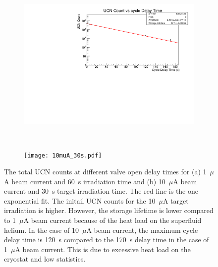 \begin{figure}[h!]
  \centering
  \begin{subfigure}{.8\textwidth}
    \centering
    \includegraphics[width=1.0\textwidth]{17002_StorageLifetime.pdf}
    \caption{}
    \label{fig:storage_example1}
  \end{subfigure}%
  \\
  \begin{subfigure}{.8\textwidth}
    \centering
    \texttt{[image: 10muA\_30s.pdf]}
    \caption{}
    \label{fig:storage_example10}
  \end{subfigure}
  \caption[UCN storage lifetime extraction for two beam currents]{The
    total UCN counts at different valve open delay times for (a)
    1~$\mu$A beam current and 60~s irradiation time and (b) 10~$\mu$A
    beam current and 30~s target irradiation time. The red line is the
    one exponential fit. The initail UCN counts for the 10~$\mu$A
    target irradiation is higher. However, the storage lifetime is
    lower compared to 1~$\mu$A beam current because of the heat load
    on the superfluid helium. In the case of 10~$\mu$A beam current,
    the maximum cycle delay time is 120~s compared to the 170~s delay
    time in the case of 1~$\mu$A beam current. This is due to
    excessive heat load on the cryostat and low statistics.}
  \label{fig:storage_example}
\end{figure}


